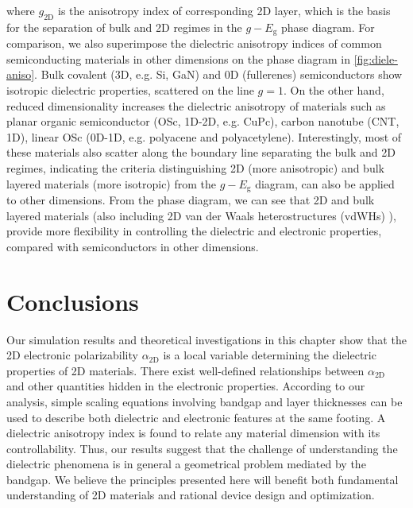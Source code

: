 where $g_{\mathrm{2D}}$ is the anisotropy index of corresponding 2D
layer, which is the basis for the separation of bulk and 2D regimes in
the $g-E_{\mathrm{g}}$ phase diagram.  For comparison, we also
superimpose the dielectric anisotropy indices of common semiconducting
materials in other dimensions on the phase diagram in
\autoref{fig:diele-aniso}. Bulk covalent (3D, e.g. Si, GaN) and 0D
(fullerenes) semiconductors show isotropic dielectric properties,
scattered on the line $g=1$. On the other hand, reduced dimensionality
increases the dielectric anisotropy of materials such as planar
organic semiconductor (OSc, 1D-2D, e.g. CuPc), carbon nanotube (CNT,
1D), linear OSc (0D-1D, e.g. polyacene and
polyacetylene). Interestingly, most of these materials also scatter
along the boundary line separating the bulk and 2D regimes, indicating
the criteria distinguishing 2D (more anisotropic) and bulk layered
materials (more isotropic) from the $g-E_{\mathrm{g}}$ diagram, can
also be applied to other dimensions. From the phase diagram, we can
see that 2D and bulk layered materials (also including 2D van der
Waals heterostructures (vdWHs) \autocite{Novoselov_2016_vdW}), provide more
flexibility in controlling the dielectric and electronic properties,
compared with semiconductors in other dimensions.

%


\section{Conclusions}

Our simulation results and theoretical investigations in this chapter
show that the 2D electronic polarizability $\alpha_{\mathrm{2D}}$ is a
local variable determining the dielectric properties of 2D materials.
There exist well-defined relationships between $\alpha_{\mathrm{2D}}$
and other quantities hidden in the electronic properties.  According
to our analysis, simple scaling equations involving bandgap and layer
thicknesses can be used to describe both dielectric and electronic
features at the same footing. A dielectric anisotropy index is found
to relate any material dimension with its controllability.  Thus, our
results suggest that the challenge of understanding the dielectric
phenomena is in general a geometrical problem mediated by the
bandgap. We believe the principles presented here will benefit both
fundamental understanding of 2D materials and rational device
design and optimization.




